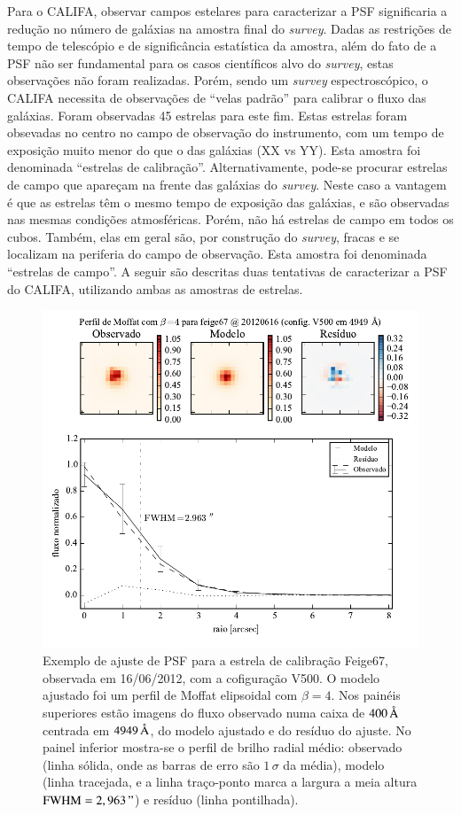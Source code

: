 Para o CALIFA, observar campos estelares para caracterizar a PSF significaria a
redução no número de galáxias na amostra final do {\em survey}. Dadas as
restrições de tempo de telescópio e de significância estatística da amostra,
além do fato de a PSF não ser fundamental para os casos científicos alvo do {\em
survey}, estas observações não foram realizadas. Porém, sendo um {\em survey}
espectroscópico, o CALIFA necessita de observações de ``velas padrão'' para
calibrar o fluxo das galáxias. Foram observadas 45 estrelas para este fim. Estas
estrelas foram obsevadas no centro no campo de observação do instrumento, com um
tempo de exposição muito menor do que o das galáxias (XX vs YY\fixme). Esta
amostra foi denominada ``estrelas de calibração''. Alternativamente, pode-se
procurar estrelas de campo que apareçam na frente das galáxias do {\em survey}.
Neste caso a vantagem é que as estrelas têm o mesmo tempo de exposição das
galáxias, e são observadas nas mesmas condições atmosféricas. Porém, não há
estrelas de campo em todos os cubos. Também, elas em geral são, por construção
do {\em survey}, fracas e se localizam na periferia do campo de observação.
Esta amostra foi denominada ``estrelas de campo''. A seguir são descritas duas
tentativas de caracterizar a PSF do CALIFA, utilizando ambas as amostras de
estrelas.

\begin{figure}
	\includegraphics{figuras/PSFMoffatBeta4_exemplo}
	\caption[Exemplo de ajuste de PSF para estrela de calibração.]
	{Exemplo de ajuste de PSF para a estrela de calibração Feige67, observada em
	16/06/2012, com a cofiguração V500. O modelo ajustado foi um perfil de
	Moffat elipsoidal com $\beta=4$. Nos painéis superiores estão imagens do fluxo
	observado numa caixa de $400\,\text{\normalfont\AA}$ centrada em $4949\,\text{\normalfont\AA}$,
	do modelo ajustado e do resíduo do ajuste. No painel inferior mostra-se o
	perfil de brilho radial médio: observado (linha sólida, onde as barras de erro
	são $1\,\sigma$ da média), modelo (linha tracejada, e a linha traço-ponto marca
	a largura a meia altura $\mathrm{FWHM}=2,963\,"$) e resíduo (linha
	pontilhada).}
	\label{fig:PSFExemplo}
\end{figure}

